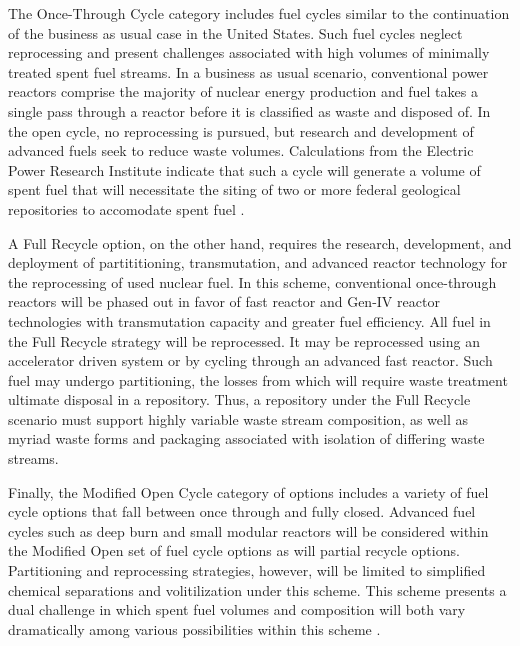 The Once-Through Cycle category includes fuel cycles similar to the 
continuation of the business as usual case in the United States.
Such fuel cycles neglect reprocessing and present challenges 
associated with high volumes of minimally treated spent fuel streams.  
In a business as usual scenario, 
conventional power reactors comprise the majority of nuclear energy 
production and fuel takes a single pass through a reactor before it is 
classified as waste and disposed of. In the open cycle, no 
reprocessing is pursued, but research and development of advanced 
fuels seek to reduce waste volumes. Calculations from the Electric 
Power Research Institute indicate that such a cycle will generate a 
volume of spent fuel that will necessitate the siting of two or more 
federal  geological repositories to accomodate spent fuel 
\cite{kessler_room_2006}.  %

A Full Recycle option, on the other hand, requires the research, 
development, and deployment of partititioning, transmutation, and 
advanced reactor technology for the reprocessing of used nuclear fuel.  
In this scheme, conventional once-through reactors will be phased out 
in favor of fast reactor and Gen-IV reactor technologies with 
transmutation capacity and greater fuel efficiency. All fuel in the 
Full Recycle strategy will be reprocessed. It may be reprocessed using  
an accelerator driven system or by cycling through an advanced fast 
reactor. Such fuel may undergo partitioning, the losses from which will 
require waste treatment ultimate disposal in a repository. Thus, a 
repository under the Full Recycle scenario must support highly 
variable waste stream composition, as well as myriad waste forms and 
packaging associated with isolation of differing waste streams.

Finally, the Modified Open Cycle category of options includes a 
variety of fuel cycle options that fall between once through and fully 
closed. Advanced fuel cycles such as deep burn and small modular 
reactors will be considered within the Modified Open set of fuel cycle 
options as will partial recycle options. Partitioning and reprocessing 
strategies, however, will be limited to simplified chemical 
separations and volitilization under this scheme. This scheme presents
a dual challenge in which spent fuel volumes and composition will both 
vary dramatically among various possibilities within this scheme 
\cite{doe_nuclear_2010} .


